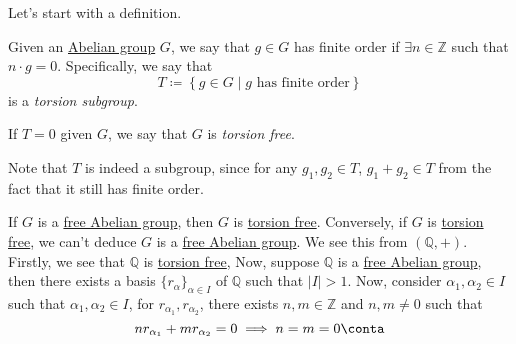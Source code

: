 Let's start with a definition.

\begin{definition}\label{def:torsion-subgroup}
	Given an \hyperref[def:Abelian-group]{Abelian group} \(G\), we say that \(g\in G\) has finite order if \(\exists n\in \mathbb{Z} \) such that
	\(n\cdot g = 0\). Specifically, we say that
	\[
		T\coloneqq \left\{g\in G\mid g\text{ has finite order}\right\}
	\]
	is a \emph{torsion subgroup}.

	If \(T= 0\) given \(G\), we say that \(G\) is \emph{torsion free}.\label{def:torsion-free}
\end{definition}
\begin{note}
	Note that \(T\) is indeed a subgroup, since for any \(g_1, g_2\in T\), \(g_1 + g_2\in T\) from the fact that it still has finite order.
\end{note}

\begin{remark}
	If \(G\) is a \hyperref[def:free-Abelian-group]{free Abelian group}, then \(G\) is \hyperref[def:torsion-free]{torsion free}. Conversely, if \(G\) is
	\hyperref[def:torsion-free]{torsion free}, we can't deduce \(G\) is a \hyperref[def:free-Abelian-group]{free Abelian group}. We see this from
	\((\mathbb{Q} , +)\). Firstly, we see that \(\mathbb{Q} \) is \hyperref[def:torsion-free]{torsion free},
	Now, suppose \(\mathbb{Q} \) is a \hyperref[def:free-Abelian-group]{free Abelian group}, then there exists a basis \(\{r_\alpha \}_{\alpha \in I}\)
	of \(\mathbb{Q} \) such that \(\left\vert I \right\vert > 1\). Now, consider \(\alpha _1, \alpha _2\in I\) such that \(\alpha _1, \alpha _2\in I\), for
	\(r_{\alpha _1}, r_{\alpha _2}\), there exists \(n, m\in \mathbb{Z} \) and \(n, m\neq 0\) such that
	\[
		n r_{\alpha _1} + m r_{\alpha _2} = 0 \implies n = m = 0\conta
	\]
\end{remark}

